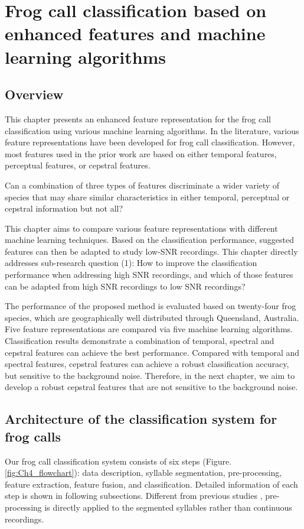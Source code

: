 
\chapter[Frog call classification based on enhanced features]{Frog call classification based on enhanced features and machine learning algorithms}
\label{cha:cha4EnhancedFeature}



\section{Overview}
\label{S:1}

This chapter presents an enhanced feature representation for the frog call classification using various machine learning algorithms. In the literature, various feature representations have been developed for frog call classification. However, most features used in the prior work are based on either temporal features, perceptual features, or cepstral features. 

Can a combination of three types of features discriminate a wider variety of species that may share similar characteristics in either temporal, perceptual or cepstral information but not all?

This chapter aims to compare various feature representations with different machine learning techniques. Based on the classification performance, suggested features can then be adapted to study low-SNR recordings. This chapter directly addresses sub-research question (1):  How to improve the classification performance when addressing high SNR recordings, and which of those features can be adapted from high SNR recordings to low SNR recordings?

The performance of the proposed method is evaluated based on twenty-four frog species, which are geographically well distributed through Queensland, Australia. Five feature representations are compared via five machine learning algorithms. Classification results demonstrate a combination of temporal, spectral and cepstral features can achieve the best performance. Compared with temporal and spectral features, cepstral features can achieve a robust classification accuracy, but sensitive to the background noise. Therefore, in the next chapter, we aim to develop a robust cepstral features that are not sensitive to the background noise.



\section{Architecture of the classification system for frog calls}
Our frog call classification system consists of six steps (Figure.~ \ref{fig:Ch4_flowchart}): data description, syllable segmentation, pre-processing,  feature extraction, feature fusion, and classification. Detailed information of each step is shown in following subsections. Different from previous studies \citep{huang2009frog, Xie1504:Acoustic}, pre-processing is directly applied to the segmented syllables rather than continuous recordings.

